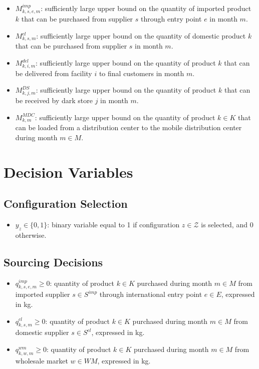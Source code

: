 \documentclass[12pt]{article}
\begin{document}
\begin{itemize}
    \item $M^{imp}_{k,s,e,m}$: sufficiently large upper bound on the quantity of imported product $k$ that can be purchased from supplier $s$ through entry point $e$ in month $m$.

    \item $M^{cl}_{k,s,m}$: sufficiently large upper bound on the quantity of domestic product $k$ that can be purchased from supplier $s$ in month $m$.

    \item $M^{del}_{k,i,m}$: sufficiently large upper bound on the quantity of product $k$ that can be delivered from facility $i$ to final customers in month $m$.

    \item $M^{DS}_{k,j,m}$: sufficiently large upper bound on the quantity of product $k$ that can be received by dark store $j$ in month $m$.

    \item $M^{MDC}_{k,m}$: sufficiently large upper bound on the quantity of product $k \in K$ that can be loaded from a distribution center to the mobile distribution center during month $m \in M$.
\end{itemize}

\newpage

\section{Decision Variables}

\subsection{Configuration Selection}

\begin{itemize}
    \item $y_z \in \{0,1\}$: binary variable equal to 1 if configuration $z \in \mathcal{Z}$ is selected, and 0 otherwise.
\end{itemize}

\subsection{Sourcing Decisions}

\begin{itemize}
    \item $q^{imp}_{k,s,e,m} \geq 0$: quantity of product $k \in K$ purchased during month $m \in M$ from imported supplier $s \in S^{imp}$ through international entry point $e \in E$, expressed in kg.

    \item $q^{cl}_{k,s,m} \geq 0$: quantity of product $k \in K$ purchased during month $m \in M$ from domestic supplier $s \in S^{cl}$, expressed in kg.

    \item $q^{wm}_{k,w,m} \geq 0$: quantity of product $k \in K$ purchased during month $m \in M$ from wholesale market $w \in WM$, expressed in kg.
\end{itemize}
\end{document}
